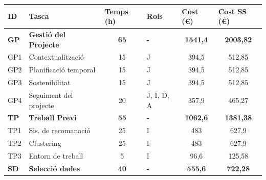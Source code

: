 \documentclass[a4paper,12pt]{report}
\begin{document}
\begin{table}[H]
    \centering
    \begin{tabular}{|l|l|c|l|c|c|}
    \hline
    \textbf{ID} & \textbf{Tasca}               & \multicolumn{1}{l|}{\textbf{Temps (h)}} & \textbf{Rols}       & \multicolumn{1}{l|}{\textbf{Cost (€)}} & \multicolumn{1}{l|}{\textbf{Cost SS (€)}} \\ \hline
    \textbf{GP} & \textbf{Gestió del Projecte} & \textbf{65}                             & \textbf{-}          & \textbf{1541,4}                        & \textbf{2003,82}                          \\ \hline
    GP1         & Contextualització            & 15                                      & J                   & 394,5                                  & 512,85                                    \\
    GP2         & Planificació temporal        & 15                                      & J                   & 394,5                                  & 512,85                                    \\
    GP3         & Sostenibilitat               & 15                                      & J                   & 394,5                                  & 512,85                                    \\
    GP4         & Seguiment del projecte       & 20                                      & J, I, D, A          & 357,9                                  & 465,27                                    \\ \hline
    \textbf{TP} & \textbf{Treball Previ}       & \textbf{55}                             & \textbf{-}          & \textbf{1062,6}                        & \textbf{1381,38}                          \\ \hline
    TP1         & Sis. de recomanació          & 25                                      & I                   & 483                                    & 627,9                                     \\
    TP2         & Clustering                   & 25                                      & I                   & 483                                    & 627,9                                     \\
    TP3         & Entorn de treball            & 5                                       & I                   & 96,6                                   & 125,58                                    \\ \hline
    \textbf{SD} & \textbf{Selecció dades}      & \textbf{40}                             & \textbf{-}          & \textbf{555,6}                         & \textbf{722,28}                           \\ \hline

\end{tabular}
\end{table}
\end{document}
